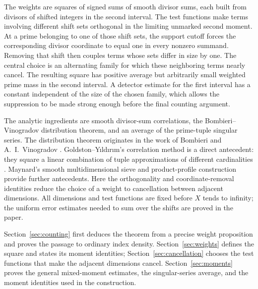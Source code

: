 The weights are squares of signed sums of smooth divisor sums, each
built from divisors of shifted integers in the second interval.
The test functions make terms involving different shift sets
orthogonal in the limiting unmarked second moment.
At a prime belonging to one of those shift sets, the support cutoff
forces the corresponding divisor coordinate to equal one in every
nonzero summand. Removing that shift then couples terms whose
sets differ in size by one. The central choice is an alternating
family for which these neighboring terms nearly cancel.
The resulting square has positive average but arbitrarily small
weighted prime mass in the second interval. A detector estimate
for the first interval has a constant independent of the size of
the chosen family, which allows the suppression to be made strong
enough before the final counting argument.

The analytic ingredients are smooth divisor-sum correlations, the
Bombieri--Vinogradov distribution theorem, and an average of the
prime-tuple singular series. The distribution theorem originates
in the work of Bombieri and A.~I.~Vinogradov
\cite{Bombieri1965,Vinogradov1965}.
Goldston--Y{\i}ld{\i}r{\i}m's correlation method is a direct
antecedent: they square a linear combination of tuple approximations
of different cardinalities
\cite[p.~6, equation~(2.14) and the preceding paragraph]{GY2005}.
Maynard's smooth multidimensional sieve and product-profile
construction \cite{Maynard2015} provide further antecedents.
Here the orthogonality and coordinate-removal identities reduce the
choice of a weight to cancellation between adjacent dimensions.
All dimensions and test functions are fixed before $X$ tends to
infinity; the uniform error estimates needed to sum over the shifts
are proved in the paper.

Section~\ref{sec:counting} first deduces the theorem from a precise
weight proposition and proves the passage to ordinary index density.
Section~\ref{sec:weights} defines the square and states its moment
identities; Section~\ref{sec:cancellation} chooses the test functions
that make the adjacent dimensions cancel.
Section~\ref{sec:moments} proves the general mixed-moment estimates,
the singular-series average, and the moment identities used in the
construction.
